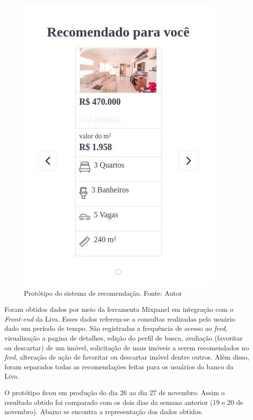 \begin{figure}[H]
    \centering
    \includegraphics[scale=0.6]{figuras/consideracoes_finais/prototipo_simulacao_rs.jpg}
    \caption[Protótipo do sistema de recomendação]{Protótipo do sistema de recomendação. Fonte: Autor}
    \label{fig:prototipo_simulacao_rs}
\end{figure}

Foram obtidos dados por meio da ferramenta Mixpanel em integração com o \textit{Front-end} da Liva. Esses dados referem-se a consultas realizadas pelo usuário dado um período de tempo. São registradas a frequência de acesso ao \textit{feed}, visualização a pagina de detalhes, edição do perfil de busca, avaliação (favoritar ou descartar) de um imóvel, solicitação de mais imóveis a serem recomendados no \textit{feed}, alteração de ação de favoritar ou descartar imóvel dentre outros. Além disso, foram separados todas as recomendações feitas para os usuários do banco da Liva.

O protótipo ficou em produção do dia 26 ao dia 27 de novembro. Assim o resultado obtido foi comparado com os dois dias da semana anterior (19 e 20 de novembro). Abaixo se encontra a representação dos dados obtidos.


